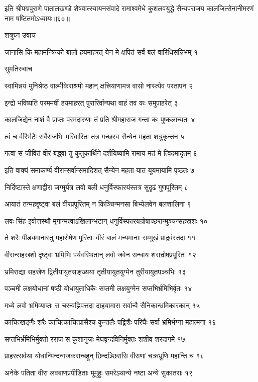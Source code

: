इति श्रीपद्मपुराणे पातालखण्डे शेषवात्स्यायनसंवादे रामाश्वमेधे कुशलवयुद्धे सैन्यपराजय कालजित्सेनानीमरणं नाम षष्टितमोऽध्यायः॥६०॥


शत्रुघ्न उवाच

जानासि किं महामन्त्रिन्को बालो हयमाहरत्
येन मे क्षपितं सर्वं बलं वारिधिसन्निभम् १

सुमतिरुवाच

स्वामिन्नयं मुनिश्रेष्ठ वाल्मीकेराश्रमो महान्
क्षत्त्रियाणामत्र वासो नास्त्येव परतापन २

इन्द्रो भविष्यति परममर्षी हयमाहरत्
पुरारिर्वान्यथा वाहं तव कः समुपाहरेत् ३

कालजिद्येन नाशं वै प्राप्तः परमदारुणः
तं प्रति श्रीमहाराज गन्ता कः पुष्कलान्यतः ४

त्वं च वीरैर्भटैः सर्वैराजभिः परिवारितः
तत्र गच्छस्व सैन्येन महता शत्रुकृन्तन ५

गत्वा स जीवितं वीरं बद्ध्वा तु कुतुकार्थिने
दर्शयिष्यामि रामाय मतं मे त्विदमादृतम् ६

इति वाक्यं समाकर्ण्य वीरान्सर्वान्समादिशत्
सैन्येन महता यात यूयमायामि पृष्ठतः ७

निर्दिष्टास्ते क्षणाद्वीरा जग्मुर्यत्र लवो बली
धनुर्विस्फारयंस्तत्र सुदृढं गुणपूरितम् ८

आयातं तन्महद्दृष्ट्वा बलं वीरप्रपूरितम्
न किञ्चिन्मनसा बिभ्येलवेन बलशालिना ९

लवः सिंह इवोत्तस्थौ मृगान्मत्वाऽखिलान्भटान्
धनुर्विस्फारयन्रोषाच्छरान्मुञ्चन्सहस्रशः १०

ते शरैः पीड्यमानास्तु महारोषेण पूरिताः
वीरं बालं मन्यमानाः सम्मुखं प्राद्रवंस्तदा ११

वीरान्सहस्रशो दृष्ट्वा भ्रमिभिः पर्यवस्थितान्
लवो जवेन सन्धाय शरान्रोषप्रपूरितः १२

भ्रमिराद्या सहस्रेण द्वितीयायुतसङ्ख्यया
तृतीयायुतयुग्मेन तुरीयायुतपञ्चभिः १३

पञ्चमी लक्षयोधानां षष्ठी योधायुताधिकैः
सप्तमी लक्षयुग्मेन सप्तभिर्भ्रमिभिर्वृतः १४

मध्ये लवो भ्रमिव्याप्तः स चरन्वह्निवत्तदा
दाहयामास सर्वान्वै सैनिकान्भ्रमिकारकान् १५

काचित्खङ्गैः शरैः काचित्काचित्प्रासैश्च कुन्तलैः
पट्टिशैः परिघैः सर्वा भ्रमिर्भग्ना महात्मना १६

सप्तभिर्भ्रमिभिर्मुक्तो रराज स कुशानुजः
मेघवृन्दविनिर्मुक्तः शशीव शरदागमे १७

प्राहरत्सर्वथा योधान्भिन्दन्गजकरान्बहून्
छिन्दञ्छिरांसि वीराणां चक्रभ्रूणि महान्ति च १८

अनेके पतिता वीरा लवबाणप्रपीडिताः
मुमुहुः समरेऽथान्ये नष्टा अन्ये सुकातराः १९

